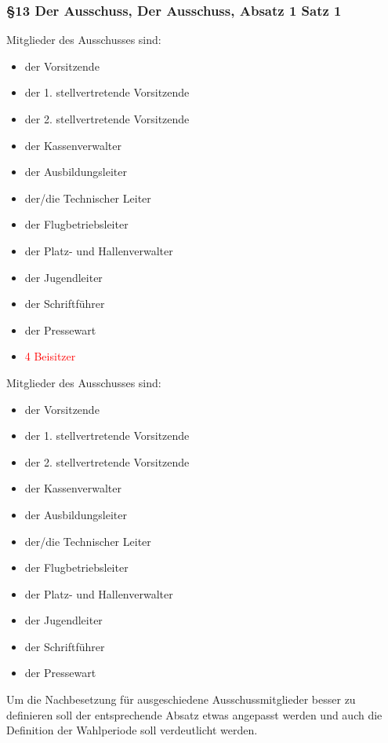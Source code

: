 \documentclass[10pt,a4paper,parskip=half]{scrartcl}
\newcommand{\old}[1]{\textcolor{Red}{#1}}
\newcommand{\change}[1]{
  \begin{adjustwidth}{20pt}{20pt}
    #1
  \end{adjustwidth}
}
\begin{document}
\change{
  \subsubsection*{§13 Der Ausschuss, Der Ausschuss, Absatz 1 Satz 1}
  \begin{multicols}{2}
    Mitglieder des Ausschusses sind:
    \begin{itemize}[noitemsep]
      \item der Vorsitzende
      \item der 1. stellvertretende Vorsitzende
      \item der 2. stellvertretende Vorsitzende
      \item der Kassenverwalter
      \item der Ausbildungsleiter
      \item der/die Technischer Leiter
      \item der Flugbetriebsleiter
      \item der Platz- und Hallenverwalter
      \item der Jugendleiter
      \item der Schriftführer
      \item der Pressewart
      \item \old{4 Beisitzer}
    \end{itemize}
    \columnbreak
    Mitglieder des Ausschusses sind:
    \begin{itemize}[noitemsep]
      \item der Vorsitzende
      \item der 1. stellvertretende Vorsitzende
      \item der 2. stellvertretende Vorsitzende
      \item der Kassenverwalter
      \item der Ausbildungsleiter
      \item der/die Technischer Leiter
      \item der Flugbetriebsleiter
      \item der Platz- und Hallenverwalter
      \item der Jugendleiter
      \item der Schriftführer
      \item der Pressewart
    \end{itemize}
  \end{multicols}
}

Um die Nachbesetzung für ausgeschiedene Ausschussmitglieder besser zu definieren soll der entsprechende Absatz etwas angepasst werden und auch die Definition der Wahlperiode soll verdeutlicht werden.
\end{document}
